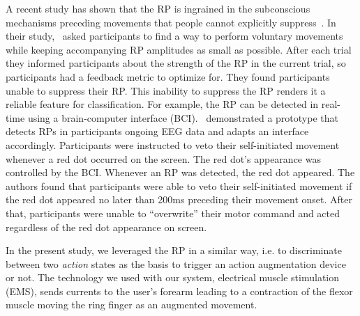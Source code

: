 A recent study has shown that the RP is ingrained in the subconscious mechanisms preceding movements that people cannot explicitly suppress~\cite{Schultze-Kraft2021-cu}. In their study,~\citet{Schultze-Kraft2021-cu} asked participants to find a way to perform voluntary movements while keeping accompanying RP amplitudes as small as possible. After each trial they informed participants about the strength of the RP in the current trial, so participants had a feedback metric to optimize for. They found participants unable to suppress their RP. This inability to suppress the RP renders it a reliable feature for classification. For example, the RP can be detected in real-time using a brain-computer interface (BCI).~\citet{Schultze-Kraft2016-bx} demonstrated a prototype that detects RPs in participants ongoing EEG data and adapts an interface accordingly. Participants were instructed to veto their self-initiated movement whenever a red dot occurred on the screen. The red dot's appearance was controlled by the BCI. Whenever an RP was detected, the red dot appeared. The authors found that participants were able to veto their self-initiated movement if the red dot appeared no later than 200ms preceding their movement onset. After that, participants were unable to ``overwrite'' their motor command and acted regardless of the red dot appearance on screen. 

In the present study, we leveraged the RP in a similar way, i.e. to discriminate between two \textit{action} states as the basis to trigger an action augmentation device or not. The technology we used with our system, electrical muscle stimulation (EMS), sends currents to the user's forearm leading to a contraction of the flexor muscle moving the ring finger as an augmented movement.




